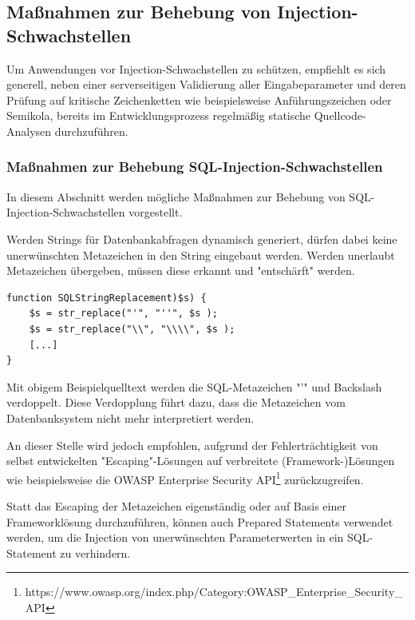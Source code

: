 \subsection{Maßnahmen zur Behebung von Injection-Schwachstellen}

Um Anwendungen vor Injection-Schwachstellen zu schützen, empfiehlt es 
sich generell, neben einer serverseitigen Validierung aller 
Eingabeparameter und deren Prüfung auf kritische Zeichenketten wie 
beispielsweise Anführungszeichen oder Semikola, bereits im 
Entwicklungsprozess regelmäßig statische Quellcode-Analysen 
durchzuführen.

\subsubsection{Maßnahmen zur Behebung SQL-Injection-Schwachstellen}
In diesem Abschnitt werden mögliche Maßnahmen zur Behebung von 
SQL-Injection-Schwachstellen vorgestellt.

\label{escpace_metazeichen}

Werden Strings für Datenbankabfragen dynamisch generiert, dürfen dabei 
keine unerwünschten Metazeichen in den String eingebaut werden. Werden 
unerlaubt Metazeichen übergeben, müssen diese erkannt und "entschärft" 
werden.

\begin{lstlisting}[basicstyle=\ttfamily\footnotesize]
function SQLStringReplacement)$s) {
    $s = str_replace("'", "''", $s );
    $s = str_replace("\\", "\\\\", $s );
    [...]
}
\end{lstlisting}


Mit obigem Beispielquelltext werden die SQL-Metazeichen "'" und Backslash 
verdoppelt. Diese Verdopplung führt dazu, dass die Metazeichen vom 
Datenbanksystem nicht mehr interpretiert werden. 

An dieser Stelle wird jedoch empfohlen, aufgrund der Fehlerträchtigkeit 
von selbst entwickelten "Escaping"-Lösungen auf verbreitete 
(Framework-)Lösungen wie beispielsweise die OWASP Enterprise 
Security API\footnote{https://www.owasp.org/index.php/Category:OWASP\_Enterprise\_Security\_API} 
zurückzugreifen.


Statt das Escaping der Metazeichen eigenständig oder auf Basis einer 
Frameworklösung durchzuführen, können auch Prepared Statements verwendet 
werden, um die Injection von unerwünschten Parameterwerten in ein 
SQL-Statement zu verhindern.

